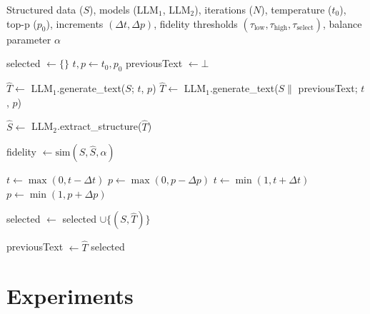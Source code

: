 \documentclass[11pt]{article}
\begin{document}
\begin{algorithm}[ht!]
  \caption{Structure-to-Text-and-Back Loop}
  \label{alg:loop}
  \begin{algorithmic}[1]
    \Require Structured data ($S$), models (LLM$_1$, LLM$_2$), iterations ($N$), temperature ($t_0$), top-p ($p_0$), increments $(\Delta t, \Delta p)$, fidelity thresholds $(\tau_{\mathrm{low}}, \tau_{\mathrm{high}}, \tau_{\mathrm{select}})$, balance parameter $\alpha$
    
    \State selected $\leftarrow \{\}$
    \State $t, p \leftarrow t_0, p_0$
    \State previousText $\leftarrow \bot$

        
            \State $\hat{T} \leftarrow$ LLM$_1$.generate\_text($S$; $t$, $p$)
        \Else
            \State $\hat{T} \leftarrow$ LLM$_1$.generate\_text($S \parallel$ previousText; $t$, $p$)
        \EndIf
        
        \State $\hat{S} \leftarrow$ LLM$_2$.extract\_structure($\hat{T}$)
        
        \State fidelity $\leftarrow \mathrm{sim}(S,\hat{S}, \alpha)$

            \State $t \leftarrow \max(0, t - \Delta t)$
            \State $p \leftarrow \max(0, p - \Delta p)$
            \State $t \leftarrow \min(1, t + \Delta t)$
            \State $p \leftarrow \min(1, p + \Delta p)$
        \EndIf

            \State selected $\leftarrow$ selected $\cup \{(S,\hat{T})\}$
        \EndIf
        
        \State previousText $\leftarrow \hat{T}$
    \EndFor
    \State \Return selected
  \end{algorithmic}
\end{algorithm}

\section{Experiments}
\label{sec:experiments}
\end{document}
